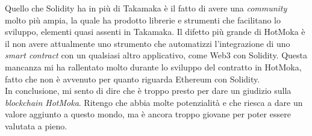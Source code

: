 Quello che Solidity ha in più di Takamaka è il fatto di avere una \textit{community} molto più ampia, la quale ha prodotto librerie e strumenti che facilitano lo sviluppo, elementi quasi assenti in Takamaka. Il difetto più grande di HotMoka è il non avere attualmente uno strumento che automatizzi l'integrazione di uno \textit{smart contract} con un qualsiasi altro applicativo, come Web3 con Solidity. Questa mancanza mi ha rallentato molto durante lo sviluppo del contratto in HotMoka, fatto che non è avvenuto per quanto riguarda Ethereum con Solidity. \\

In conclusione, mi sento di dire che è troppo presto per dare un giudizio sulla \textit{blockchain HotMoka}. Ritengo che abbia molte potenzialità e che riesca a dare un valore aggiunto a questo mondo, ma è ancora troppo giovane per poter essere valutata a pieno. 
